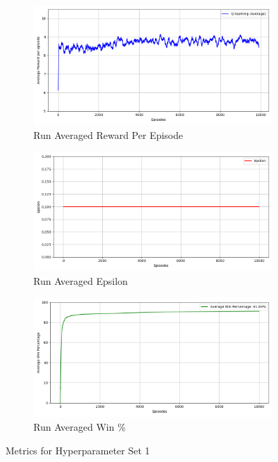 \documentclass[a4paper,9pt]{scrartcl}
\begin{document}
\begin{figure}[H]
\centering
\begin{subfigure}[b]{0.32\textwidth}
\includegraphics[width=\textwidth]{images/q_learning_rewards_avg(1).png}
\caption{Run Averaged Reward Per Episode}
\label{fig:set1_rewards}
\end{subfigure}
\hfill
\begin{subfigure}[b]{0.32\textwidth}
\includegraphics[width=\textwidth]{images/q_learning_epsilon_avg(1).png}
\caption{Run Averaged Epsilon}
\label{fig:set1_epsilon}
\end{subfigure}
\hfill
\begin{subfigure}[b]{0.32\textwidth}
\includegraphics[width=\textwidth]{images/q_learning_win_percentage_avg(1).png}
\caption{Run Averaged Win \%}
\label{fig:set1_winpercent}
\end{subfigure}
\caption{Metrics for Hyperparameter Set 1}
\label{fig:set1_metrics}
\end{figure}
\end{document}
